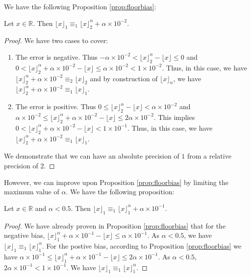 \documentclass[runningheads]{llncs}
\begin{document}
\noindent We have the following Proposition \ref{prop:floorbias}:
\begin{proposition}\label{prop:floorbias}
  Let $x\in\mathbb{R}$. Then $\lfloor x\rfloor_1 \equiv_1 \lfloor x \rfloor_2^\alpha + \alpha\times10^{-2}$.
\end{proposition}
\begin{proof}
  We have two cases to cover: \begin{enumerate}
    \item The error is negative. Thus $-\alpha\times 10^{-2} < \lfloor x \rfloor_2^\alpha - \lfloor x \rfloor \leq 0$ and $0 < \lfloor x \rfloor_2^\alpha + \alpha\times 10^{-2} - \lfloor x \rfloor \leq \alpha\times 10^{-2} < 1\times 10^{-2}$. Thus, in this case, we have $\lfloor x \rfloor_2^\alpha + \alpha\times 10^{-2} \equiv_2 \lfloor x \rfloor_2$ and by construction of $\lfloor x \rfloor_n$, we have $\lfloor x \rfloor_2^\alpha + \alpha\times 10^{-2} \equiv_1 \lfloor x \rfloor_1$.
    \item The error is positive. Thus $0 \leq \lfloor x \rfloor_2^\alpha - \lfloor x \rfloor < \alpha\times10^{-2}$ and $\alpha\times10^{-2} \leq \lfloor x \rfloor_2^\alpha + \alpha\times 10^{-2} - \lfloor x \rfloor \leq 2\alpha\times 10^{-2}$. This implies $0<\lfloor x \rfloor_2^\alpha + \alpha\times 10^{-2} - \lfloor x \rfloor<1\times10^{-1}$. Thus, in this case, we have $\lfloor x \rfloor_2^\alpha + \alpha\times 10^{-2} \equiv_1 \lfloor x \rfloor_1$.
  \end{enumerate}
  We demonstrate that we can have an absolute precision of $1$ from a relative precision of $2$.
\end{proof}

However, we can improve upon Proposition \ref{prop:floorbias} by limiting the maximum value of $\alpha$. We have the following proposition:\begin{proposition}\label{prop:floorbiasopt}
  Let $x\in\mathbb{R}$ and $\alpha<\num{0.5}$. Then $\lfloor x\rfloor_1 \equiv_1 \lfloor x \rfloor_1^\alpha + \alpha\times10^{-1}$.
\end{proposition}
\begin{proof}
  We have already proven in Proposition \ref{prop:floorbias} that for the negative bias, $\lfloor x \rfloor_1^\alpha + \alpha\times 10^{-1} - \lfloor x \rfloor \leq \alpha\times 10^{-1}$. As $\alpha<0.5$, we have $\lfloor x \rfloor_1 \equiv_1 \lfloor x \rfloor_1^\alpha$. For the postive bias, according to Proposition \ref{prop:floorbias} we have $\alpha\times10^{-1} \leq \lfloor x \rfloor_1^\alpha + \alpha\times 10^{-1} - \lfloor x \rfloor \leq 2\alpha\times 10^{-1}$. As $\alpha<\num{0.5}$, $2\alpha\times 10^{-1}<1\times 10^{-1}$. We have $\lfloor x \rfloor_1 \equiv_1 \lfloor x \rfloor_1^\alpha$.
\end{proof}
\end{document}

